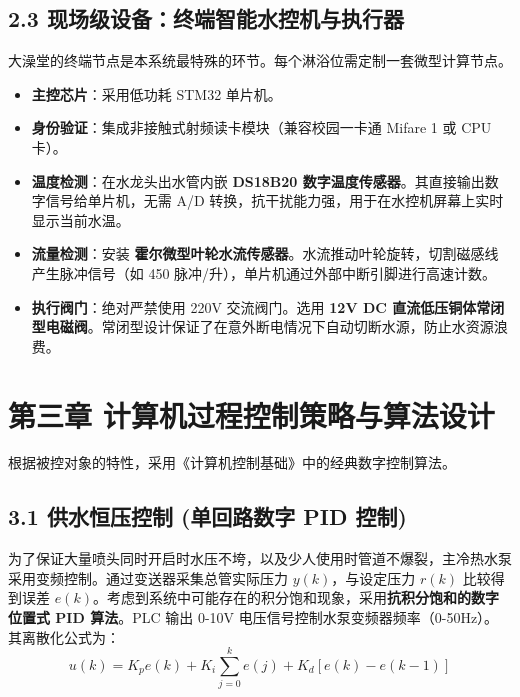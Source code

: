 \documentclass[11pt,a4paper,UTF8]{ctexart}
\begin{document}
\subsection{2.3 现场级设备：终端智能水控机与执行器}
大澡堂的终端节点是本系统最特殊的环节。每个淋浴位需定制一套微型计算节点。
\begin{itemize}
    \item \textbf{主控芯片}：采用低功耗 STM32 单片机。
    \item \textbf{身份验证}：集成非接触式射频读卡模块（兼容校园一卡通 Mifare 1 或 CPU 卡）。
    \item \textbf{温度检测}：在水龙头出水管内嵌 \textbf{DS18B20 数字温度传感器}。其直接输出数字信号给单片机，无需 A/D 转换，抗干扰能力强，用于在水控机屏幕上实时显示当前水温。
    \item \textbf{流量检测}：安装 \textbf{霍尔微型叶轮水流传感器}。水流推动叶轮旋转，切割磁感线产生脉冲信号（如 450 脉冲/升），单片机通过外部中断引脚进行高速计数。
    \item \textbf{执行阀门}：绝对严禁使用 220V 交流阀门。选用 \textbf{12V DC 直流低压铜体常闭型电磁阀}。常闭型设计保证了在意外断电情况下自动切断水源，防止水资源浪费。
\end{itemize}


\section{第三章 计算机过程控制策略与算法设计}
根据被控对象的特性，采用《计算机控制基础》中的经典数字控制算法。

\subsection{3.1 供水恒压控制 (单回路数字 PID 控制)}
为了保证大量喷头同时开启时水压不垮，以及少人使用时管道不爆裂，主冷热水泵采用变频控制。通过变送器采集总管实际压力 $y(k)$，与设定压力 $r(k)$ 比较得到误差 $e(k)$。考虑到系统中可能存在的积分饱和现象，采用\textbf{抗积分饱和的数字位置式 PID 算法}。PLC 输出 0-10V 电压信号控制水泵变频器频率（0-50Hz）。其离散化公式为：
\begin{equation}
u(k) = K_p e(k) + K_i \sum_{j=0}^k e(j) + K_d [e(k) - e(k-1)]
\end{equation}
\end{document}
